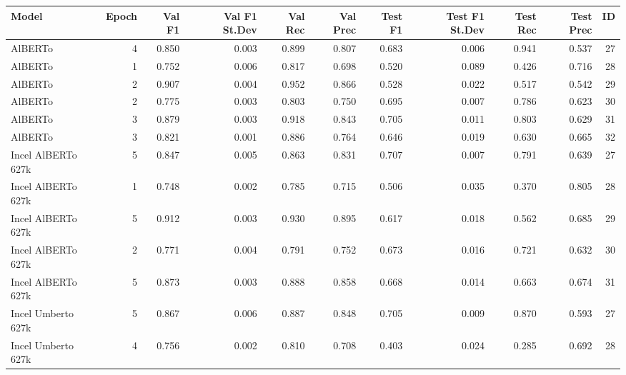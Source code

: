 \begin{tabular}{lrrrrrrrrrr}
\toprule
             Model &  Epoch &  Val F1 &  Val F1 St.Dev &  Val Rec &  Val Prec &  Test F1 &  Test F1 St.Dev &  Test Rec &  Test Prec &  ID \\
\midrule
           AlBERTo &      4 &   0.850 &          0.003 &    0.899 &     0.807 &    0.683 &           0.006 &     0.941 &      0.537 &  27 \\
           AlBERTo &      1 &   0.752 &          0.006 &    0.817 &     0.698 &    0.520 &           0.089 &     0.426 &      0.716 &  28 \\
           AlBERTo &      2 &   0.907 &          0.004 &    0.952 &     0.866 &    0.528 &           0.022 &     0.517 &      0.542 &  29 \\
           AlBERTo &      2 &   0.775 &          0.003 &    0.803 &     0.750 &    0.695 &           0.007 &     0.786 &      0.623 &  30 \\
           AlBERTo &      3 &   0.879 &          0.003 &    0.918 &     0.843 &    0.705 &           0.011 &     0.803 &      0.629 &  31 \\
           AlBERTo &      3 &   0.821 &          0.001 &    0.886 &     0.764 &    0.646 &           0.019 &     0.630 &      0.665 &  32 \\
Incel AlBERTo 627k &      5 &   0.847 &          0.005 &    0.863 &     0.831 &    0.707 &           0.007 &     0.791 &      0.639 &  27 \\
Incel AlBERTo 627k &      1 &   0.748 &          0.002 &    0.785 &     0.715 &    0.506 &           0.035 &     0.370 &      0.805 &  28 \\
Incel AlBERTo 627k &      5 &   0.912 &          0.003 &    0.930 &     0.895 &    0.617 &           0.018 &     0.562 &      0.685 &  29 \\
Incel AlBERTo 627k &      2 &   0.771 &          0.004 &    0.791 &     0.752 &    0.673 &           0.016 &     0.721 &      0.632 &  30 \\
Incel AlBERTo 627k &      5 &   0.873 &          0.003 &    0.888 &     0.858 &    0.668 &           0.014 &     0.663 &      0.674 &  31 \\
Incel Umberto 627k &      5 &   0.867 &          0.006 &    0.887 &     0.848 &    0.705 &           0.009 &     0.870 &      0.593 &  27 \\
Incel Umberto 627k &      4 &   0.756 &          0.002 &    0.810 &     0.708 &    0.403 &           0.024 &     0.285 &      0.692 &  28 \\

\end{tabular}
